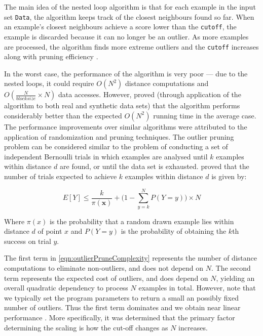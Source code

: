 The main idea of the nested loop algorithm is that for each example in the
input set \verb+Data+, the algorithm keeps track of the closest neighbours found
so far. When an example's closest neighbours achieve a score lower than the
\verb+cutoff+, the example is discarded because it can no longer be an outlier.
As more examples are processed, the algorithm finds more extreme outliers and
the \verb+cutoff+ increases along with pruning efficiency \cite{Bay:2003}.

In the worst case, the performance of the algorithm is very poor --- due to the
nested loops, it could require $O(N^{2})$ distance computations and
$O(\frac{N}{blocksize} \times N)$ data accesses. However, \citeauthor{Bay:2003}
proved (through application of the algorithm to both real and synthetic data
sets) that the algorithm performs considerably better than the expected
$O(N^{2})$ running time in the average case. The performance improvements over
similar algorithms were attributed to the application of randomization and
pruning techniques. The outlier pruning problem can be considered similar to the
problem of conducting a set of independent Bernoulli trials in which examples
are analysed until $k$ examples within distance $d$ are found, or until the data
set is exhausted. \citeauthor{Bay:2003} proved that the number of trials
expected to achieve $k$ examples within distance $d$ is given by:

\begin{equation}
\label{eqn:outlierPruneComplexity}
E[Y] \leq \frac{k}{\pi(\textbf{x})} + \Bigg(1 - \sum_{y=k}^{N} P(Y=y)\Bigg) \times N
\end{equation}

Where $\pi(x)$ is the probability that a random drawn example lies within
distance $d$ of point $x$ and $P(Y=y)$ is the probability of obtaining the $k$th
success on trial $y$.

The first term in \autoref{eqn:outlierPruneComplexity} represents the number of
distance computations to eliminate non-outliers, and does not depend on $N$. The
second term represents the expected cost of outliers, and does depend on $N$,
yielding an overall quadratic dependency to process $N$ examples in total.
However, note that we typically set the program parameters to return a small an
possibly fixed number of outliers. Thus the first term dominates and we obtain
near linear performance \cite{Bay:2003}. More specifically, it was determined
that the primary factor determining the scaling is how the cut-off changes as
$N$ increases.

